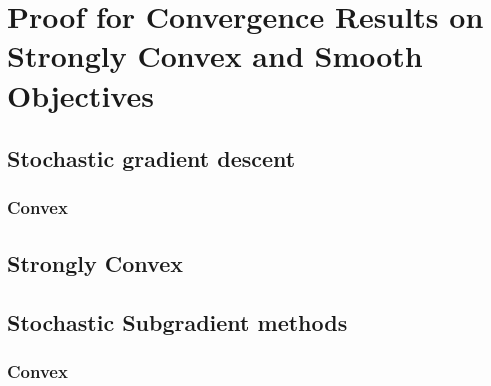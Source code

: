 




\section{Proof for Convergence Results on Strongly Convex and Smooth Objectives}



\subsection{Stochastic gradient descent}
\subsubsection{Convex}
\label{sec:convexsmoothsgd}
% 




\subsection{Strongly Convex}


\subsection{Stochastic Subgradient methods}
\subsubsection{Convex}
\label{sec:sgdcvxnonsmth}


